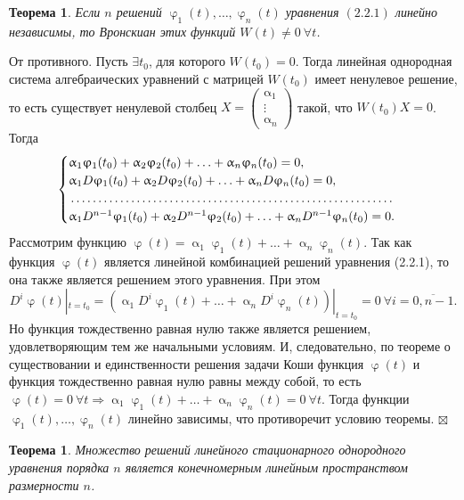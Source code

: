 \documentclass[a4paper, 12pt]{report}
\newenvironment{Proof} %
{\par\noindent{$\blacklozenge$}} %
{\hfill$\scriptstyle\boxtimes$}
\renewcommand{\alpha}{\upalpha}
\renewcommand{\varphi}{\upvarphi}
\begin{document}
	\newtheorem*{2_2_2}{Теорема} \begin{2_2_2} Если $n$ решений $\varphi_1(t), \ldots, \varphi_n(t)$ уравнения $(2.2.1)$ линейно независимы, то Вронскиан этих функций $W(t) \ne 0\ \forall t$.
	\end{2_2_2} \begin{Proof}
		От противного. Пусть $\exists t_0$, для которого $W(t_0) = 0$. Тогда линейная однородная система алгебраических уравнений с матрицей $W(t_0)$ имеет ненулевое решение, то есть существует ненулевой столбец $X = \begin{pmatrix}
			\alpha_1 \\ \vdots \\ \alpha_n
		\end{pmatrix}$ такой, что $W(t_0)X = 0$. Тогда $$\begin{cases}
			\alpha_1\varphi_1(t_0) + \alpha_2\varphi_2(t_0) + \ldots + \alpha_n\varphi_n(t_0) = 0,\\
			\alpha_1D\varphi_1(t_0) + \alpha_2D\varphi_2(t_0) + \ldots + \alpha_nD\varphi_n(t_0) = 0,\\
			\dotfill\\
			\alpha_1D^{n-1}\varphi_1(t_0) + \alpha_2D^{n-1}\varphi_2(t_0) + \ldots + \alpha_nD^{n-1}\varphi_n(t_0) = 0.
		\end{cases}$$ Рассмотрим функцию $\varphi(t) = \alpha_1\varphi_1(t) + \ldots + \alpha_n\varphi_n(t)$. Так как функция $\varphi(t)$ является линейной комбинацией решений уравнения (2.2.1), то она также является решением этого уравнения. При этом $$D^i\varphi(t)|_{t=t_0} = (\alpha_1D^i\varphi_1(t) + \ldots + \alpha_nD^i\varphi_n(t))|_{t=t_0} = 0\ \forall i = \overline{0, n-1}.$$
		Но функция тождественно равная нулю также является решением, удовлетворяющим тем же начальными условиям. И, следовательно, по теореме о существовании и единственности решения задачи Коши функция $\varphi(t)$ и функция тождественно равная нулю равны между собой, то есть $\varphi(t) = 0\ \forall t \Rightarrow \alpha_1\varphi_1(t) + \ldots + \alpha_n\varphi_n(t) = 0\ \forall t$. Тогда функции $\varphi_1(t),\ldots,\varphi_n(t)$ линейно зависимы, что противоречит условию теоремы.
	\end{Proof}
	\newtheorem*{2_2_3}{Теорема}\begin{2_2_3}
		Множество решений линейного стационарного однородного уравнения порядка $n$ является конечномерным линейным пространством размерности $n$.
	\end{2_2_3}
\end{document}
